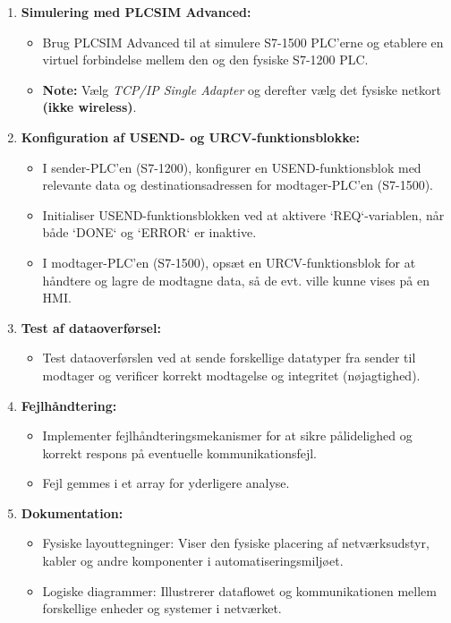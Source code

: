\begin{enumerate}
\begin{itemize}
	\end{itemize}
	\item \textbf{Simulering med PLCSIM Advanced:}
	\begin{itemize}
		\item Brug PLCSIM Advanced til at simulere S7-1500 PLC'erne og etablere en virtuel forbindelse mellem den og den fysiske S7-1200 PLC.
		\item \textbf{Note:} Vælg \textit{TCP/IP Single Adapter} og derefter vælg det fysiske netkort \textbf{(ikke wireless)}.
	\end{itemize}
	\item \textbf{Konfiguration af USEND- og URCV-funktionsblokke:}
	\begin{itemize}
		\item I sender-PLC'en (S7-1200), konfigurer en USEND-funktionsblok med relevante data og destinationsadressen for modtager-PLC'en (S7-1500).
		\item Initialiser USEND-funktionsblokken ved at aktivere `REQ`-variablen, når både `DONE` og `ERROR` er inaktive.
		\item I modtager-PLC'en (S7-1500), opsæt en URCV-funktionsblok for at håndtere og lagre de modtagne data, så de evt. ville kunne vises på en HMI.
	\end{itemize}
	\item \textbf{Test af dataoverførsel:}
	\begin{itemize}
		\item Test dataoverførslen ved at sende forskellige datatyper fra sender til modtager og verificer korrekt modtagelse og integritet (nøjagtighed).
	\end{itemize}
	\item \textbf{Fejlhåndtering:}
	\begin{itemize}
		\item Implementer fejlhåndteringsmekanismer for at sikre pålidelighed og korrekt respons på eventuelle kommunikationsfejl.
		\item Fejl gemmes i et array for yderligere analyse.
	\end{itemize}
	\item \textbf{Dokumentation:}
	\begin{itemize}
		\item Fysiske layouttegninger: Viser den fysiske placering af netværksudstyr, kabler og andre komponenter i automatiseringsmiljøet.
		\item Logiske diagrammer: Illustrerer dataflowet og kommunikationen mellem forskellige enheder og systemer i netværket.

\end{itemize}
\end{enumerate}
